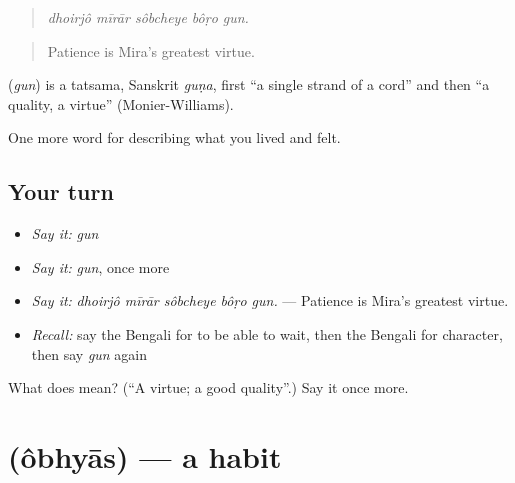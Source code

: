 \begin{quote}
    
\end{quote}

\begin{quote}
\emph{dhoirjô mīrār sôbcheye bôṛo gun.}
\end{quote}

\begin{quote}
Patience is Mira's greatest virtue.
\end{quote}

\begin{cousinweb}
\textbf{} (\emph{gun}) is a tatsama, Sanskrit \emph{guṇa}, first \textquotedblleft{}a single strand of a cord\textquotedblright{} and then \textquotedblleft{}a quality, a virtue\textquotedblright{} (Monier-Williams).
\end{cousinweb}

\begin{grammarlens}[title={What you've built}]
One more word for describing what you lived and felt.
\end{grammarlens}

\subsection*{Your turn}
\begin{itemize}
\raggedright
  \item \emph{Say it:} \emph{gun}
  \item \emph{Say it:} \emph{gun}, once more
  \item \emph{Say it:} \emph{dhoirjô mīrār sôbcheye bôṛo gun.} — Patience is Mira's greatest virtue.
  \item \emph{Recall:} say the Bengali for to be able to wait, then the Bengali for character, then say \emph{gun} again
\end{itemize}

\begin{tcolorbox}[breakable,colback=teal!4,colframe=teal!35!black,title={Before you move on}]
What does  mean? (\textquotedblleft{}A virtue; a good quality\textquotedblright{}.) Say it once more.
\end{tcolorbox}
\section[\texorpdfstring{\bn{অভ্যাস} (ôbhyās)}{অভ্যাস (ôbhyās)}]{ (ôbhyās) — a habit}

\label{lesson:BN-C456-obhyas}



